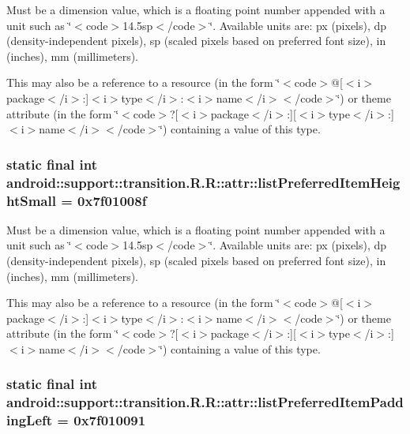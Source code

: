 Must be a dimension value, which is a floating point number appended with a unit such as \char`\"{}$<$code$>$14.5sp$<$/code$>$\char`\"{}. Available units are: px (pixels), dp (density-independent pixels), sp (scaled pixels based on preferred font size), in (inches), mm (millimeters). 

This may also be a reference to a resource (in the form \char`\"{}$<$code$>$@\mbox{[}$<$i$>$package$<$/i$>$:\mbox{]}$<$i$>$type$<$/i$>$:$<$i$>$name$<$/i$>$$<$/code$>$\char`\"{}) or theme attribute (in the form \char`\"{}$<$code$>$?\mbox{[}$<$i$>$package$<$/i$>$:\mbox{]}\mbox{[}$<$i$>$type$<$/i$>$:\mbox{]}$<$i$>$name$<$/i$>$$<$/code$>$\char`\"{}) containing a value of this type. \hypertarget{classandroid_1_1support_1_1transition_1_1_r_1_1attr_f6a4b9952690fd929627db29d203601b}{
\subsubsection[{listPreferredItemHeightSmall}]{\setlength{\rightskip}{0pt plus 5cm}static final int android::support::transition.R.R::attr::listPreferredItemHeightSmall = 0x7f01008f}}
\label{classandroid_1_1support_1_1transition_1_1_r_1_1attr_f6a4b9952690fd929627db29d203601b}


Must be a dimension value, which is a floating point number appended with a unit such as \char`\"{}$<$code$>$14.5sp$<$/code$>$\char`\"{}. Available units are: px (pixels), dp (density-independent pixels), sp (scaled pixels based on preferred font size), in (inches), mm (millimeters). 

This may also be a reference to a resource (in the form \char`\"{}$<$code$>$@\mbox{[}$<$i$>$package$<$/i$>$:\mbox{]}$<$i$>$type$<$/i$>$:$<$i$>$name$<$/i$>$$<$/code$>$\char`\"{}) or theme attribute (in the form \char`\"{}$<$code$>$?\mbox{[}$<$i$>$package$<$/i$>$:\mbox{]}\mbox{[}$<$i$>$type$<$/i$>$:\mbox{]}$<$i$>$name$<$/i$>$$<$/code$>$\char`\"{}) containing a value of this type. \hypertarget{classandroid_1_1support_1_1transition_1_1_r_1_1attr_4bf9f088a2ac747a7df4a10d92cb1c44}{
\subsubsection[{listPreferredItemPaddingLeft}]{\setlength{\rightskip}{0pt plus 5cm}static final int android::support::transition.R.R::attr::listPreferredItemPaddingLeft = 0x7f010091}}
\label{classandroid_1_1support_1_1transition_1_1_r_1_1attr_4bf9f088a2ac747a7df4a10d92cb1c44}


